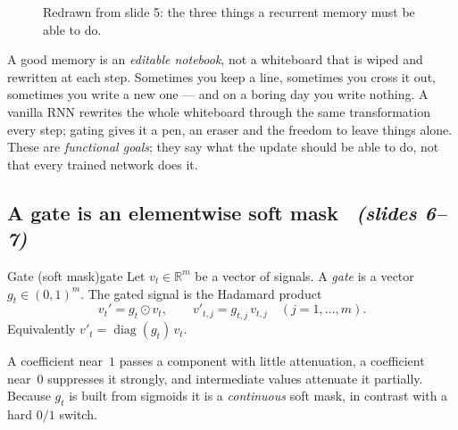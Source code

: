 \documentclass[11pt,a4paper]{article}
\newcommand{\R}{\mathbb{R}}
\newcommand{\diag}{\operatorname{diag}}
\newcommand{\sltag}[1]{\texorpdfstring{\ \emph{(slides #1)}}{ (slides #1)}}
\begin{document}
\begin{figure}[H]\centering
{}
\caption{Redrawn from slide 5: the three things a recurrent memory must be able to do.}
\end{figure}

\begin{intuition}
A good memory is an \emph{editable notebook}, not a whiteboard that is wiped and rewritten at each step. Sometimes you keep a line, sometimes you cross it out, sometimes you write a new one --- and on a boring day you write nothing. A vanilla RNN rewrites the whole whiteboard through the same transformation every step; gating gives it a pen, an eraser and the freedom to leave things alone. These are \emph{functional goals}; they say what the update should be able to do, not that every trained network does it.
\end{intuition}

\subsection{A gate is an elementwise soft mask \sltag{6--7}}

\begin{definition}{Gate (soft mask)}{gate}
Let $v_t\in\R^m$ be a vector of signals. A \emph{gate} is a vector $g_t\in(0,1)^m$. The gated signal is the Hadamard product
\[
v_t'=g_t\odot v_t,\qquad v'_{t,j}=g_{t,j}\,v_{t,j}\quad(j=1,\dots,m).
\]
Equivalently $v'_t=\diag(g_t)\,v_t$.
\end{definition}

A coefficient near~$1$ passes a component with little attenuation, a coefficient near~$0$ suppresses it strongly, and intermediate values attenuate it partially. Because $g_t$ is built from sigmoids it is a \emph{continuous} soft mask, in contrast with a hard $0/1$ switch.
\end{document}
